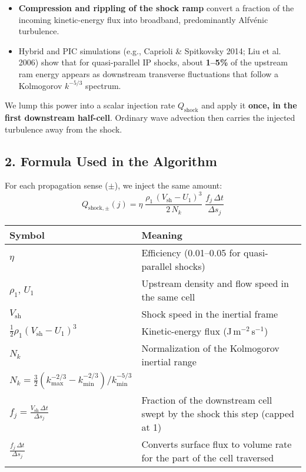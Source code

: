\begin{itemize}
  \item \textbf{Compression and rippling of the shock ramp} convert a fraction of the incoming kinetic-energy flux into broadband, predominantly Alfvénic turbulence.
  \item Hybrid and PIC simulations (e.g., Caprioli \& Spitkovsky 2014; Liu et al. 2006) show that for quasi-parallel IP shocks, about \textbf{1--5\%} of the upstream ram energy appears as downstream transverse fluctuations that follow a Kolmogorov $k^{-5/3}$ spectrum.
\end{itemize}

We lump this power into a scalar injection rate $Q_{\text{shock}}$ and apply it \textbf{once, in the first downstream half-cell}. Ordinary wave advection then carries the injected turbulence away from the shock.

\subsection*{2. Formula Used in the Algorithm}

For each propagation sense ($\pm$), we inject the same amount:
\[
\boxed{
Q_{\text{shock},\pm}(j)
   = \eta\;
     \frac{\rho_1\,(V_{\text{sh}}-U_1)^{3}}{2\,N_k}\;
     \frac{f_j\,\Delta t}{\Delta s_j}
} \tag{2}
\]

\begin{tabular}{@{}ll@{}}
\toprule
\textbf{Symbol} & \textbf{Meaning} \\
\midrule
$\eta$ & Efficiency (0.01–0.05 for quasi-parallel shocks) \\
$\rho_1$, $U_1$ & Upstream density and flow speed in the same cell \\
$V_{\text{sh}}$ & Shock speed in the inertial frame \\
$\frac{1}{2} \rho_1 (V_{\text{sh}} - U_1)^3$ & Kinetic-energy flux (J\,m$^{-2}$\,s$^{-1}$) \\
$N_k$ & Normalization of the Kolmogorov inertial range \\
$N_k = \tfrac{3}{2}\left(k_{\max}^{-2/3} - k_{\min}^{-2/3}\right)/k_{\min}^{-5/3}$ & \\
$f_j = \frac{V_{\text{sh}}\,\Delta t}{\Delta s_j}$ & Fraction of the downstream cell swept by the shock this step (capped at 1) \\
$\frac{f_j\,\Delta t}{\Delta s_j}$ & Converts surface flux to volume rate for the part of the cell traversed \\
\bottomrule
\end{tabular}

